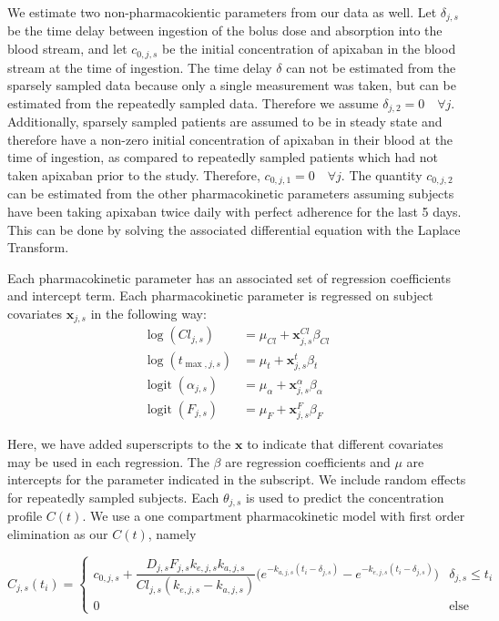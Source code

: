 We estimate two non-pharmacokientic parameters from our data as well.  Let $\delta_{j, s}$ be the time delay between ingestion of the bolus dose and absorption into the blood stream, and let $c_{0, j, s}$ be the initial concentration of apixaban in the blood stream at the time of ingestion.  The time delay $\delta$ can not be estimated from the sparsely sampled data because only a single measurement was taken, but can be estimated from the repeatedly sampled data.  Therefore we assume $\delta_{j, 2}=0 \quad \forall j$.  Additionally, sparsely sampled patients are assumed to be in steady state and therefore have a non-zero initial concentration of apixaban in their blood at the time of ingestion, as compared to repeatedly sampled patients which had not taken apixaban prior to the study.  Therefore, $c_{0, j, 1} = 0 \quad \forall j$.  The quantity $c_{0, j , 2}$ can be estimated from the other pharmacokinetic parameters assuming subjects have been taking apixaban twice daily with perfect adherence for the last 5 days.   This can be done by solving the associated differential equation with the Laplace Transform.


Each pharmacokinetic parameter has an associated set of regression coefficients and intercept term.  Each pharmacokinetic parameter is regressed on subject covariates $\mathbf{x}_{j, s}$ in the following way:
\begin{align}
 \log(\mathit{Cl}_{j, s}) &= \mu_{\mathit{Cl}} + \mathbf{x}_{j, s}^{\mathit{Cl}} \beta_{\mathit{Cl}}\\
 \log(t_{\max,j, s}) &= \mu_{t} + \mathbf{x}_{j, s}^{t} \beta_{t} \\
 \operatorname{logit}(\alpha_{j, s}) &= \mu_{\alpha} + \mathbf{x}_{j, s}^\alpha \beta_{\alpha}\\
 \operatorname{logit}(F_{j, s}) &= \mu_{F} + \mathbf{x}_{j, s}^{F} \beta_{F}
\end{align}





Here, we have added superscripts to the $\mathbf{x}$ to indicate that different covariates may be used in each regression. The $\beta$ are regression coefficients and $\mu$ are intercepts for the parameter indicated in the subscript. We include random effects for repeatedly sampled subjects. Each $\theta_{j, s}$ is used to predict the concentration profile $C(t)$.  We use a one compartment pharmacokinetic model with first order elimination as our $C(t)$, namely

$$ C_{j, s}(t_i) =  \begin{cases} c_{0, j, s} + \dfrac{D_{j, s} F_{j, s} k_{e, j, s} k_{a, j, s}}{\mathit{Cl}_{j, s}(k_{e, j, s} - k_{a, j, s})} \Bigg( e^{-k_{a, j, s}(t_i - \delta_{j, s})} - e^{-k_{e, j, s}(t_i - \delta_{j, s})} \Bigg)  & \delta_{j, s} \leq t_i \\ 0 & \mbox{else} \end{cases}$$

